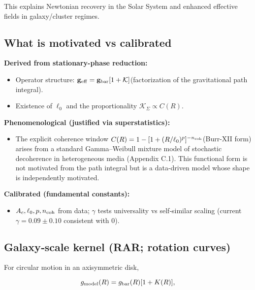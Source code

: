 \documentclass[11pt,a4paper]{article}
\begin{document}
This explains Newtonian recovery in the Solar System and enhanced effective fields in galaxy/cluster regimes.


\subsection{What is motivated vs calibrated}


\textbf{Derived from stationary-phase reduction:}

\begin{itemize}
\item Operator structure: $\allowbreak \mathbf{g}_{\rm eff}=\mathbf{g}_{\rm bar}[1+\mathcal{K}]$\allowbreak  (factorization of the gravitational path integral).
\item Existence of $\ell_0$ and the proportionality $\allowbreak \mathcal{K}_\Sigma\propto C(R)$\allowbreak .
\end{itemize}


\textbf{Phenomenological (justified via superstatistics):}

\begin{itemize}
\item The explicit coherence window $\allowbreak C(R)=1-[1+(R/\ell_0)^p]^{-n_{\rm coh}}$\allowbreak  (Burr-XII form) arises from a standard Gamma–Weibull mixture model of stochastic decoherence in heterogeneous media (Appendix C.1). This functional form is not motivated from the path integral but is a data-driven model whose shape is independently motivated.
\end{itemize}


\textbf{Calibrated (fundamental constants):}

\begin{itemize}
\item $A_c,\ell_0,p,n_{\rm coh}$ from data; $\gamma$ tests universality vs self‑similar scaling (current $\gamma=0.09\pm0.10$ consistent with 0).
\end{itemize}



\subsection{Galaxy‑scale kernel (RAR; rotation curves)}


For circular motion in an axisymmetric disk,


\begin{equation}
g_{\rm model}(R) = g_{\rm bar}(R)[1 + K(R)],
\end{equation}
\end{document}
